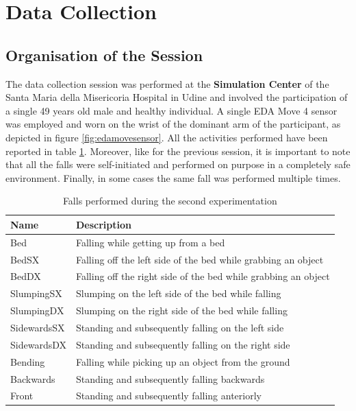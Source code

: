 \newpage

\section{Data Collection}\label{sec:edamove4-data-collection}

\subsection{Organisation of the Session}\label{subsec:session-org}

The data collection session was performed at the \textbf{Simulation Center} of the Santa Maria della Misericoria Hospital in Udine and involved the participation of a single 49 years old male and healthy individual. A single EDA Move 4 sensor was employed and worn on the wrist of the dominant arm of the participant, as depicted in figure \ref{fig:edamovesensor}. All the activities performed have been reported in table \ref{toc:falls-performed-edamove}. Moreover, like for the previous session, it is important to note that all the falls were self-initiated and performed on purpose in a completely safe environment. Finally, in some cases the same fall was performed multiple times.

\begin{table}[H]
\centering
\begin{tabular}{ll}
    \hline
    Name         & Description \\
    \hline
    Bed          & Falling while getting up from a bed \\
    BedSX        & Falling off the left side of the bed while grabbing an object \\
    BedDX        & Falling off the right side of the bed while grabbing an object \\
    SlumpingSX   & Slumping on the left side of the bed while falling  \\
    SlumpingDX   & Slumping on the right side of the bed while falling  \\
    SidewardsSX  & Standing and subsequently falling on the left side \\ 
    SidewardsDX  & Standing and subsequently falling on the right side \\ 
    Bending      & Falling while picking up an object from the ground \\ 
    Backwards    & Standing and subsequently falling backwards \\
    Front        & Standing and subsequently falling anteriorly  \\
    \hline
\end{tabular}
\caption{Falls performed during the second experimentation}
\label{toc:falls-performed-edamove}
\end{table}

